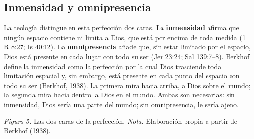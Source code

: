 \documentclass[11pt,letterpaper]{article}
\newcommand{\destacar}[1]{\textbf{\textcolor{azul}{#1}}}
\begin{document}
\subsection{Inmensidad y omnipresencia}

La teología distingue en esta perfección dos caras. La \destacar{inmensidad} afirma que ningún espacio contiene ni limita a Dios, que está por encima de toda medida (1 R 8:27; Is 40:12). La \destacar{omnipresencia} añade que, sin estar limitado por el espacio, Dios está presente en cada lugar con todo su ser (Jer 23:24; Sal 139:7--8). Berkhof define la inmensidad como la perfección por la cual Dios trasciende toda limitación espacial y, sin embargo, está presente en cada punto del espacio con todo su ser (Berkhof, 1938). La primera mira hacia arriba, a Dios sobre el mundo; la segunda mira hacia dentro, a Dios en el mundo. Ambas son necesarias: sin inmensidad, Dios sería una parte del mundo; sin omnipresencia, le sería ajeno.

\begin{center}
\par
{\footnotesize\color{gris}\textit{Figura 5.} Las dos caras de la perfección. \textit{Nota.} Elaboración propia a partir de Berkhof (1938).}
\end{center}
\end{document}
